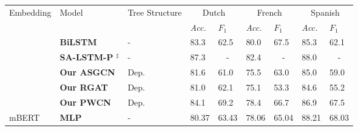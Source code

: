 \documentclass[11pt]{article}
\begin{document}
\begin{table*}[tp]
  \setlength{\tabcolsep}{0pt}\small
  \begin{tabular}{m{3cm}m{3.3cm}m{2.5cm}m{1.15cm}<{\centering}m{1.15cm}<{\centering}m{1.15cm}<{\centering}m{1.15cm}<{\centering}m{1.15cm}<{\centering}m{1.15cm}<{\centering}}
    \toprule
    \multirow{2}{*}{Embedding}        & \multirow{2}{*}{Model}        & \multirow{2}{*}{Tree Structure} & \multicolumn{2}{c}{Dutch} & \multicolumn{2}{c}{French} & \multicolumn{2}{c}{Spanish}                                                                              \\
    \cmidrule(r){4-5}\cmidrule(r){6-7}\cmidrule(r){8-9}
                                      &                               &                                 & \centering\textit{Acc.}   & \centering\textit{$F_1$}   & \centering\textit{Acc.}     & \centering\textit{$F_1$} & \centering\textit{Acc.} & \textit{$F_1$}        \\
    \midrule\
    \multirow{5}{*}{Static Embedding} & \textbf{BiLSTM}               & -                               & 83.3                      & 62.5                       & 80.0                        & 67.5                     & 85.3                    & 62.1                  \\
                                      & \textbf{SA-LSTM-P $^\sharp$ } & -                               & 87.3                      & \multicolumn{1}{c}{-}      & 82.4                        & \multicolumn{1}{c}{-}    & 88.0                    & \multicolumn{1}{c}{-} \\
                                      & \textbf{Our ASGCN }           & Dep.                            & 81.6                      & 61.0                       & 75.5                        & 63.0                     & 85.0                    & 59.0                  \\
                                      & \textbf{Our RGAT  }           & Dep.                            & 81.0                      & 62.1                       & 75.1                        & 53.3                     & 84.6                    & 55.2                  \\
                                      & \textbf{Our PWCN  }           & Dep.                            & 84.1                      & 69.2                       & 78.4                        & 66.7                     & 86.9                    & 67.5                  \\
    \midrule
    mBERT                             & \textbf{MLP     }             & -                               & 80.37                     & 63.43                      & 78.06                       & 65.04                    & 88.21                   & 68.03                 \\

\end{tabular}
\end{table*}
\end{document}
